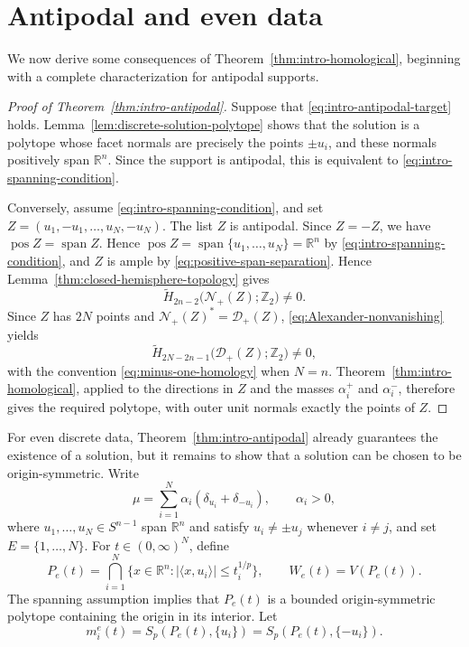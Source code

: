 \documentclass[12pt,reqno]{amsart}
\numberwithin{equation}{section}
\theoremstyle{remark}
\DeclareMathOperator{\pos}{pos}
\DeclareMathOperator{\spanop}{span}
\newcommand{\R}{\mathbb R}
\newcommand{\Ncal}{\mathcal N}
\newcommand{\Dcal}{\mathcal D}
\begin{document}
\section{Antipodal and even data}\label{sec:antipodal-even}

We now derive some consequences of
Theorem~\ref{thm:intro-homological}, beginning with a complete
characterization for antipodal supports.

\begin{proof}[Proof of Theorem~\ref{thm:intro-antipodal}]
	Suppose that \eqref{eq:intro-antipodal-target} holds.
	Lemma~\ref{lem:discrete-solution-polytope} shows that the solution is a
	polytope whose facet normals are precisely the points \(\pm u_i\), and
	these normals positively span \(\R^n\). Since the support is antipodal,
	this is equivalent to \eqref{eq:intro-spanning-condition}.
	
	Conversely, assume \eqref{eq:intro-spanning-condition}, and set
	\(Z=(u_1,-u_1,\ldots,u_N,-u_N)\). The list \(Z\) is antipodal.
	Since \(Z=-Z\), we have
	\(\pos Z=\spanop Z\). Hence
	\(\pos Z=\spanop\{u_1,\ldots,u_N\}=\R^n\) by
	\eqref{eq:intro-spanning-condition}, and \(Z\) is ample by
	\eqref{eq:positive-span-separation}.
	 Hence
	Lemma~\ref{thm:closed-hemisphere-topology} gives
	\[
	\widetilde H_{2n-2}\bigl(\Ncal_+(Z);\mathbb Z_2\bigr)\neq0.
	\]
	Since \(Z\) has \(2N\) points and
	\(\Ncal_+(Z)^*=\Dcal_+(Z)\),
	\eqref{eq:Alexander-nonvanishing} yields
	\[
	\widetilde H_{2N-2n-1}
	\bigl(\Dcal_+(Z);\mathbb Z_2\bigr)\neq0,
	\]
	with the convention \eqref{eq:minus-one-homology} when \(N=n\).
	Theorem~\ref{thm:intro-homological}, applied to the directions in
	\(Z\) and the masses \(\alpha_i^+\) and \(\alpha_i^-\), therefore
	gives the required polytope, with outer unit normals exactly the
	points of \(Z\).
\end{proof}

For even discrete data, Theorem~\ref{thm:intro-antipodal} already
guarantees the existence of a solution, but it remains to show that
a solution can be chosen to be origin-symmetric. Write
\begin{equation}\label{eq:even-data}
	\mu
	=
	\sum_{i=1}^N\alpha_i(\delta_{u_i}+\delta_{-u_i}),
	\qquad
	\alpha_i>0,
\end{equation}
where \(u_1,\ldots,u_N\in S^{n-1}\) span \(\R^n\) and satisfy
\(u_i\neq\pm u_j\) whenever \(i\neq j\), and set \(E=\{1,\ldots,N\}\). For
\(t\in(0,\infty)^N\), define
\begin{equation}\label{eq:symmetric-polytope}
	P_e(t)
	=
	\bigcap_{i=1}^N
	\{x\in\R^n:|\langle x,u_i\rangle|\leq t_i^{1/p}\},
	\qquad
	W_e(t)=V(P_e(t)).
\end{equation}
The spanning assumption implies that \(P_e(t)\) is a bounded
origin-symmetric polytope containing the origin in its interior. Let
\[
m_i^e(t)
=
S_p(P_e(t),\{u_i\})
=
S_p(P_e(t),\{-u_i\}).
\]
\end{document}
